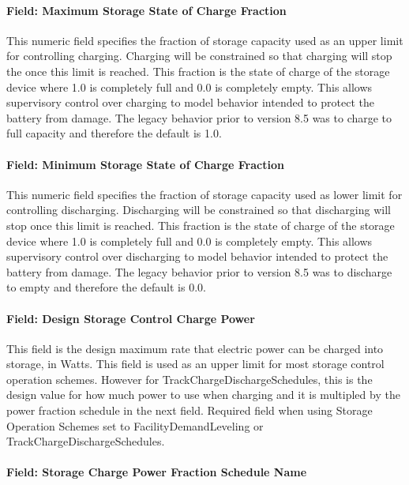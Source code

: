\paragraph{Field: Maximum Storage State of Charge Fraction}\label{field-maximum-storage-state-of-charge-fraction}

This numeric field specifies the fraction of storage capacity used as an upper limit for controlling charging. Charging will be constrained so that charging will stop the once this limit is reached. This fraction is the state of charge of the storage device where 1.0 is completely full and 0.0 is completely empty. This allows supervisory control over charging to model behavior intended to protect the battery from damage. The legacy behavior prior to version 8.5 was to charge to full capacity and therefore the default is 1.0.

\paragraph{Field: Minimum Storage State of Charge Fraction}\label{field-minimum-storage-state-of-charge-fraction}

This numeric field specifies the fraction of storage capacity used as lower limit for controlling discharging. Discharging will be constrained so that discharging will stop once this limit is reached. This fraction is the state of charge of the storage device where 1.0 is completely full and 0.0 is completely empty. This allows supervisory control over discharging to model behavior intended to protect the battery from damage. The legacy behavior prior to version 8.5 was to discharge to empty and therefore the default is 0.0.

\paragraph{Field: Design Storage Control Charge Power}\label{field-design-storage-control-charge-power}

This field is the design maximum rate that electric power can be charged into storage, in Watts. This field is used as an upper limit for most storage control operation schemes. However for TrackChargeDischargeSchedules, this is the design value for how much power to use when charging and it is multipled by the power fraction schedule in the next field. Required field when using Storage Operation Schemes set to FacilityDemandLeveling or TrackChargeDischargeSchedules.

\paragraph{Field: Storage Charge Power Fraction Schedule Name}\label{field-storage-charge-power-fraction-schedule-name}

